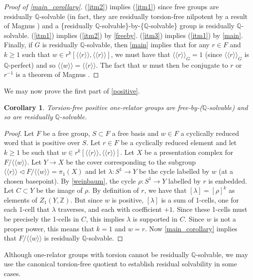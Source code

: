 \documentclass{amsart}
\newtheorem{corollary}[theorem]{Corollary}
\theoremstyle{definition}
\newcommand{\Z}{\mathbb{Z}}
\newcommand{\Q}{\mathbb{Q}}
\newcommand{\normal}[1]{\langle\!\langle #1 \rangle\!\rangle}
\begin{document}
\begin{proof}[Proof of \cref{main_corollary}]
(\ref{itm2}) implies (\ref{itm1}) since free groups are residually $\Q$-solvable (in fact, they are residually torsion-free nilpotent by a result of Magnus \cite{Ma35}) and a \{residually $\Q$-solvable\}-by-\{$\Q$-solvable\} group is residually $\Q$-solvable. (\ref{itm1}) implies (\ref{itm2}) by \cref{freeby}. (\ref{itm3}) implies (\ref{itm1}) by \cref{main}. Finally, if $G$ is residually $\Q$-solvable, then \cref{main} implies that for any $r\in F$ and $k\geqslant 1$ such that $w\in r^k[\normal{r}, \normal{r}]$, we must have that $\normal{r}_G = 1$ (since $\normal{r}_G$ is $\Q$-perfect) and so $\normal{w} = \normal{r}$. The fact that $w$ must then be conjugate to $r$ or $r^{-1}$ is a theorem of Magnus \cite{Ma30}.
\end{proof}


We may now prove the first part of \cref{positive}.

\begin{corollary}
Torsion-free positive one-relator groups are free-by-($\Q$-solvable) and so are residually $\Q$-solvable. 
\end{corollary}

\begin{proof}
Let $F$ be a free group, $S\subset F$ a free basis and $w\in F$ a cyclically reduced word that is positive over $S$. Let $r\in F$ be a cyclically reduced element and let $k\geqslant 1$ be such that $w \in r^k[\normal{r}, \normal{r}]$. Let $X$ be a presentation complex for $F/\normal{w}$. Let $Y\to X$ be the cover corresponding to the subgroup $\normal{r}\triangleleft F/\normal{w}=\pi_1(X)$ and let $\lambda\colon S^1\to Y$ be the cycle labelled by $w$ (at a chosen basepoint). By \cref{weinbaum}, the cycle $\rho\colon S^1\to Y$ labelled by $r$ is embedded. Let $C\subset Y$ be the image of $\rho$. By definition of $r$, we have that $[\lambda] = [\rho]^k$ as elements of $Z_1(Y, \Z)$. But since $w$ is positive, $[\lambda]$ is a sum of 1-cells, one for each 1-cell that $\lambda$ traverses, and each with coefficient $+1$. Since these 1-cells must be precisely the 1-cells in $C$, this implies $\lambda$ is supported in $C$. Since $w$ is not a proper power, this means that $k = 1$ and $w = r$. Now \cref{main_corollary} implies that $F/\normal{w}$ is residually $\Q$-solvable.
\end{proof}

Although one-relator groups with torsion cannot be residually $\Q$-solvable, we may use the canonical torsion-free quotient to establish residual solvability in some cases.
\end{document}
